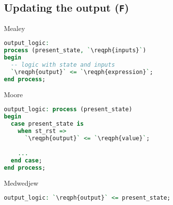 \subsection{Updating the output (\texttt{F})}
Mealey
\begin{lstlisting}[language=vhdl]
output_logic:
process (present_state, `\reqph{inputs}`)
begin
  -- logic with state and inputs
  `\reqph{output}` <= `\reqph{expression}`;
end process;
\end{lstlisting}
Moore
\begin{lstlisting}[language=vhdl]
output_logic: process (present_state)
begin
  case present_state is
    when st_rst =>
      `\reqph{output}` <= `\reqph{value}`;

    ...
  end case;
end process;
\end{lstlisting}
Medwedjew
\begin{lstlisting}[language=vhdl]
output_logic: `\reqph{output}` <= present_state;
\end{lstlisting}
